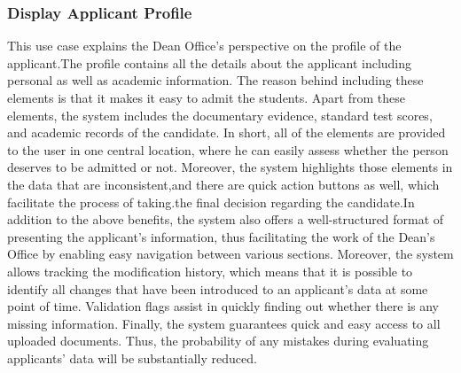 \subsubsection{Display Applicant Profile}

This use case explains the Dean Office's perspective on the profile of the applicant.The profile contains all the details about the applicant including personal as well as academic information. The reason behind including these elements is that it makes it easy to admit the students. Apart from these elements, the system includes the documentary evidence, standard test scores, and academic records of the candidate. In short, all of the elements are provided to the user in one central location, where he can easily assess whether the person deserves to be admitted or not. 
Moreover, the system highlights those elements in the data that are inconsistent,and there are quick action buttons as well, which facilitate the process of taking.the final decision regarding the candidate.In addition to the above benefits, the system also offers a well-structured format of presenting the applicant’s information, thus facilitating the work of the Dean’s Office by enabling easy navigation between various sections. Moreover, the system allows tracking the modification history, which means that it is possible to identify all changes that have been introduced to an applicant’s data at some point of time. Validation flags assist in quickly finding out whether there is any missing information. Finally, the system guarantees quick and easy access to all uploaded documents. Thus, the probability of any mistakes during evaluating applicants’ data will be substantially reduced.

\raggedbottom %

